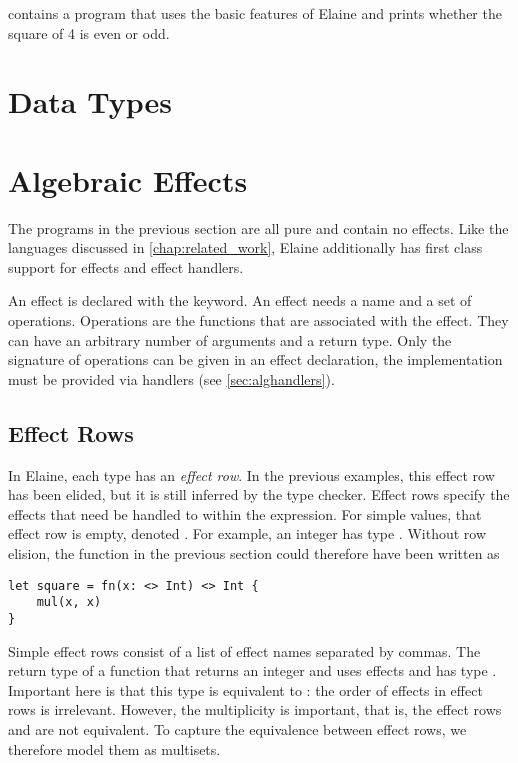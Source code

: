  contains a program that uses the basic features of Elaine and prints whether the square of 4 is even or odd. 


\section{Data Types}


\section{Algebraic Effects}

The programs in the previous section are all pure and contain no effects. Like the languages discussed in \cref{chap:related_work}, Elaine additionally has first class support for effects and effect handlers.

An effect is declared with the  keyword. An effect needs a name and a set of operations. Operations are the functions that are associated with the effect. They can have an arbitrary number of arguments and a return type. Only the signature of operations can be given in an effect declaration, the implementation must be provided via handlers (see \cref{sec:alghandlers}).

\subsection{Effect Rows}

In Elaine, each type has an \emph{effect row}. In the previous examples, this effect row has been elided, but it is still inferred by the type checker. Effect rows specify the effects that need be handled to within the expression. For simple values, that effect row is empty, denoted \el{<>}. For example, an integer has type . Without row elision, the  function in the previous section could therefore have been written as

\begin{lstlisting}[language=elaine, style=fancy]
let square = fn(x: <> Int) <> Int {
    mul(x, x)
}
\end{lstlisting}

Simple effect rows consist of a list of effect names separated by commas. The return type of a function that returns an integer and uses effects  and  has type . Important here is that this type is equivalent to : the order of effects in effect rows is irrelevant. However, the multiplicity is important, that is, the effect rows  and  are not equivalent. To capture the equivalence between effect rows, we therefore model them as multisets.

